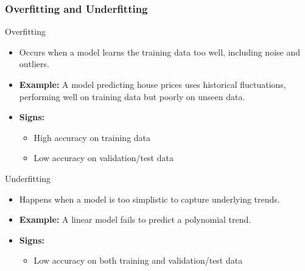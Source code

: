 \documentclass[aspectratio=169]{beamer}
\begin{document}
\begin{frame}[fragile]
    \frametitle{Overfitting and Underfitting}
    
    \begin{block}{Overfitting}
        \begin{itemize}
            \item Occurs when a model learns the training data too well, including noise and outliers.
            \item \textbf{Example:} A model predicting house prices uses historical fluctuations, performing well on training data but poorly on unseen data.
            \item \textbf{Signs:}
            \begin{itemize}
                \item High accuracy on training data
                \item Low accuracy on validation/test data
            \end{itemize}
        \end{itemize}
    \end{block}
    
    \begin{block}{Underfitting}
        \begin{itemize}
            \item Happens when a model is too simplistic to capture underlying trends.
            \item \textbf{Example:} A linear model fails to predict a polynomial trend.
            \item \textbf{Signs:}
            \begin{itemize}
                \item Low accuracy on both training and validation/test data
            \end{itemize}
        \end{itemize}
    \end{block}
\end{frame}
\end{document}
